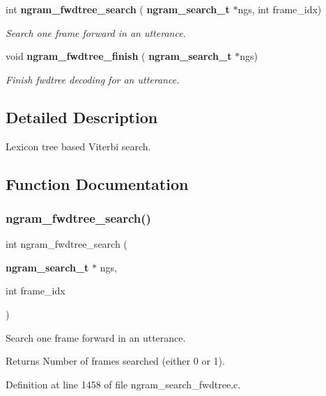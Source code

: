 \begin{DoxyCompactItemize}
int \textbf{ ngram\+\_\+fwdtree\+\_\+search} (\textbf{ ngram\+\_\+search\+\_\+t} $\ast$ngs, int frame\+\_\+idx)
\begin{DoxyCompactList}\small\item\em Search one frame forward in an utterance. \end{DoxyCompactList}\item 
\mbox{\label{ngram__search__fwdtree_8h_af32a83dbb9187542577a0c500b000840}} 
void \textbf{ ngram\+\_\+fwdtree\+\_\+finish} (\textbf{ ngram\+\_\+search\+\_\+t} $\ast$ngs)
\begin{DoxyCompactList}\small\item\em Finish fwdtree decoding for an utterance. \end{DoxyCompactList}\end{DoxyCompactItemize}


\subsection{Detailed Description}
Lexicon tree based Viterbi search. 



\subsection{Function Documentation}
\mbox{\label{ngram__search__fwdtree_8h_a9e2828ba0d249424a234b6cf7d3ee530}} 
\subsubsection{ngram\+\_\+fwdtree\+\_\+search()}
{\footnotesize\ttfamily int ngram\+\_\+fwdtree\+\_\+search (\begin{DoxyParamCaption}\item[{\textbf{ ngram\+\_\+search\+\_\+t} $\ast$}]{ngs,  }\item[{int}]{frame\+\_\+idx }\end{DoxyParamCaption})}



Search one frame forward in an utterance. 

\begin{DoxyReturn}{Returns}
Number of frames searched (either 0 or 1). 
\end{DoxyReturn}


Definition at line 1458 of file ngram\+\_\+search\+\_\+fwdtree.\+c.


